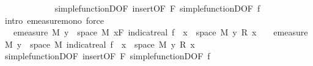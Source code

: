 \begin{isabellebody}
\ \ \ \ \ \ \ \ \ \ \isamarkupfalse%
\ {\isacharasterisk}{\kern0pt}{\isacharasterisk}{\kern0pt}\ simple{\isacharunderscore}{\kern0pt}functionD{\isacharparenleft}{\kern0pt}{}{\isacharparenright}{\kern0pt}{\isacharbrackleft}{\kern0pt}OF\ insert{\isacharparenleft}{\kern0pt}{}{\isacharparenright}{\kern0pt}{\isacharbrackleft}{\kern0pt}OF\ F{\isacharbrackright}{\kern0pt}{\isacharbrackright}{\kern0pt}\ simple{\isacharunderscore}{\kern0pt}functionD{\isacharparenleft}{\kern0pt}{}{\isacharparenright}{\kern0pt}{\isacharbrackleft}{\kern0pt}OF\ f{\isacharparenleft}{\kern0pt}{}{\isacharparenright}{\kern0pt}{\isacharbrackright}{\kern0pt}\ \isamarkupfalse%
\ {\isacharparenleft}{\kern0pt}intro\ emeasure{\isacharunderscore}{\kern0pt}mono{\isacharcomma}{\kern0pt}\ force{\isacharplus}{\kern0pt}{\isacharparenright}{\kern0pt}\isanewline
\ \ \ \ \ \ \ \ \isamarkupfalse%
\ \isamarkupfalse%
\ {\isachardoublequoteopen}{\isachardot}{\kern0pt}{\isachardot}{\kern0pt}{\isachardot}{\kern0pt}\ {\isasymle}\ emeasure\ M\ {\isacharbraceleft}{\kern0pt}y\ {\isasymin}\ space\ M{\isachardot}{\kern0pt}\ {\isacharparenleft}{\kern0pt}{\isasymSum}x{\isasymin}F{\isachardot}{\kern0pt}\ indicat{\isacharunderscore}{\kern0pt}real\ {\isacharparenleft}{\kern0pt}f\ {\isacharminus}{\kern0pt}{\isacharbackquote}{\kern0pt}\ {\isacharbraceleft}{\kern0pt}x{\isacharbraceright}{\kern0pt}\ {\isasyminter}\ space\ M{\isacharparenright}{\kern0pt}\ y\ {\isacharasterisk}{\kern0pt}\isactrlsub R\ x{\isacharparenright}{\kern0pt}\ {\isasymnoteq}\ {}{\isacharbraceright}{\kern0pt}\ {\isacharplus}{\kern0pt}\ emeasure\ M\ {\isacharbraceleft}{\kern0pt}y\ {\isasymin}\ space\ M{\isachardot}{\kern0pt}\ indicat{\isacharunderscore}{\kern0pt}real\ {\isacharparenleft}{\kern0pt}f\ {\isacharminus}{\kern0pt}{\isacharbackquote}{\kern0pt}\ {\isacharbraceleft}{\kern0pt}x{\isacharbraceright}{\kern0pt}\ {\isasyminter}\ space\ M{\isacharparenright}{\kern0pt}\ y\ {\isacharasterisk}{\kern0pt}\isactrlsub R\ x\ {\isasymnoteq}\ {}{\isacharbraceright}{\kern0pt}{\isachardoublequoteclose}\isanewline
\ \ \ \ \ \ \ \ \ \ \isamarkupfalse%
\ simple{\isacharunderscore}{\kern0pt}functionD{\isacharparenleft}{\kern0pt}{}{\isacharparenright}{\kern0pt}{\isacharbrackleft}{\kern0pt}OF\ insert{\isacharparenleft}{\kern0pt}{}{\isacharparenright}{\kern0pt}{\isacharbrackleft}{\kern0pt}OF\ F{\isacharbrackright}{\kern0pt}{\isacharbrackright}{\kern0pt}\ simple{\isacharunderscore}{\kern0pt}functionD{\isacharparenleft}{\kern0pt}{}{\isacharparenright}{\kern0pt}{\isacharbrackleft}{\kern0pt}OF\ f{\isacharparenleft}{\kern0pt}{}{\isacharparenright}{\kern0pt}{\isacharbrackright}{\kern0pt}\ \isamarkupfalse%

\end{isabellebody}
